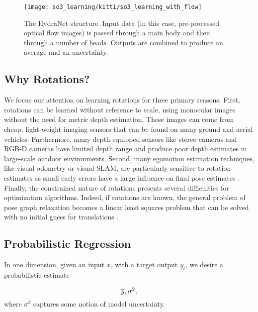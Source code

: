 \begin{figure}
	\centering
	\texttt{[image: so3\_learning/kitti/so3\_learning\_with\_flow]}
	\caption{The HydraNet structure. Input data (in this case, pre-processed optical flow images) is passed through a main body and then through a number of heads. Outputs are combined to produce an average and an uncertainty.}
	\label{fig:kitti_flow_hydranet}
\end{figure}

\subsection{Why Rotations?}
We focus our attention on learning rotations for three primary reasons. 
First, rotations can be learned without reference to scale, using monocular images without the need for metric depth estimation. These images can come from cheap, light-weight imaging sensors that can be found on many ground and aerial vehicles. Furthermore, many depth-equipped sensors like stereo cameras and RGB-D cameras have limited depth range and produce poor depth estimates in large-scale outdoor environments.  Second, many egomotion estimation techniques, like visual odometry or visual SLAM, are particularly sensitive to rotation estimates as small early errors have a large influence on final pose estimates \citep{Olson2003-ax}. Finally, the constrained nature of rotations presents several difficulties for optimization algorithms. Indeed, if rotations are known, the general problem of pose graph relaxation becomes a linear least squares problem that can be solved with no initial guess for translations \citep{Carlone2015-ud}. 

\subsection{Probabilistic Regression}

In one dimension, given an input $x$, with a target output $y_t$, we desire a probabilistic estimate

\begin{equation}
\overline{y}, \sigma^2,
\end{equation}
where $\sigma^2$ captures some notion of model uncertainty.



